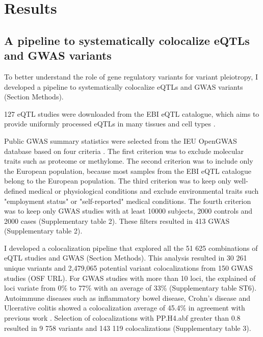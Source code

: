 \section*{Results}\label{s:results}

\subsection*{A pipeline to systematically colocalize eQTLs and GWAS variants}

To better understand the role of gene regulatory variants for variant pleiotropy, I developed a pipeline to systematically colocalize eQTLs and GWAS variants (Section Methods).

127 eQTL studies were downloaded from the EBI eQTL catalogue, which aims to provide uniformly processed eQTLs in many tissues and cell types \citep{2021.Alasoo.Kerimov}.

Public GWAS summary statistics were selected from the IEU OpenGWAS database based on four criteria \citep{2018.Parkinson.Buniello}.
%
The first criterion was to exclude molecular traits such as proteome or methylome.
%	
The second criterion was to include only the European population, because most samples from the EBI eQTL catalogue belong to the European population.
%
The third criterion was to keep only well-defined medical or physiological conditions and exclude environmental traits such "employment status" or "self-reported" medical conditions.
%
The fourth criterion was to keep only GWAS studies with at least 10000 subjects, 2000 controls and 2000 cases (Supplementary table 2).
%
These filters resulted in 413 GWAS (Supplementary table 2).

I developed a colocalization pipeline that explored all the 51 625 combinations of eQTL studies and GWAS (Section Methods).
%
This analysis resulted in 30 261 unique variants and 2,479,065 potential variant colocalizations from 150 GWAS studies (OSF URL).
%
For GWAS studies with more than 10 loci, the explained of loci variate from 0\% to 77\% with an average of 33\% (Supplementary table ST6).
%
Autoimmune diseases such as inflammatory bowel disease, Crohn's disease and Ulcerative colitis showed a colocalization average of 45.4\% in agreement with previous work \citep{2021.Li.Mu.GenomeBiology.impactcelltype}.
%
Selection of colocalizations with PP.H4.abf greater than 0.8 resulted in 9 758 variants and 143 119 colocalizations (Supplementary table 3).


